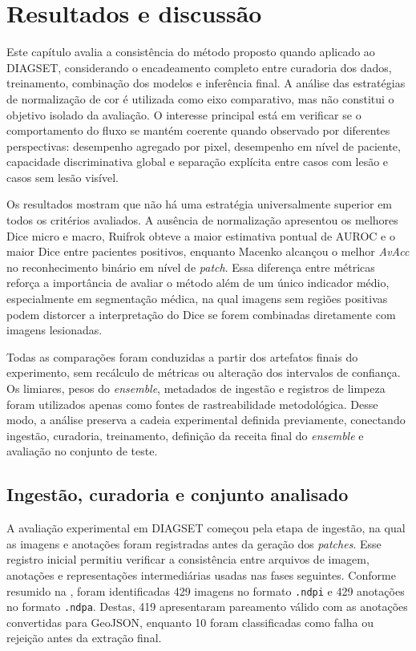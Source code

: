 \chapter{Resultados e discussão}\label{chp:resultados}

Este capítulo avalia a consistência do método proposto quando aplicado ao DIAGSET, considerando o encadeamento completo entre curadoria dos dados, treinamento, combinação dos modelos e inferência final. A análise das estratégias de normalização de cor é utilizada como eixo comparativo, mas não constitui o objetivo isolado da avaliação. O interesse principal está em verificar se o comportamento do fluxo se mantém coerente quando observado por diferentes perspectivas: desempenho agregado por pixel, desempenho em nível de paciente, capacidade discriminativa global e separação explícita entre casos com lesão e casos sem lesão visível.

Os resultados mostram que não há uma estratégia universalmente superior em todos os critérios avaliados. A ausência de normalização apresentou os melhores Dice micro e macro, Ruifrok obteve a maior estimativa pontual de AUROC e o maior Dice entre pacientes positivos, enquanto Macenko alcançou o melhor \textit{AvAcc} no reconhecimento binário em nível de \textit{patch}. Essa diferença entre métricas reforça a importância de avaliar o método além de um único indicador médio, especialmente em segmentação médica, na qual imagens sem regiões positivas podem distorcer a interpretação do Dice se forem combinadas diretamente com imagens lesionadas.

Todas as comparações foram conduzidas a partir dos artefatos finais do experimento, sem recálculo de métricas ou alteração dos intervalos de confiança. Os limiares, pesos do \textit{ensemble}, metadados de ingestão e registros de limpeza foram utilizados apenas como fontes de rastreabilidade metodológica. Desse modo, a análise preserva a cadeia experimental definida previamente, conectando ingestão, curadoria, treinamento, definição da receita final do \textit{ensemble} e avaliação no conjunto de teste.

\section{Ingestão, curadoria e conjunto analisado}
\label{sec:res_diagset_conjunto}

A avaliação experimental em DIAGSET começou pela etapa de ingestão, na qual as imagens e anotações foram registradas antes da geração dos \textit{patches}. Esse registro inicial permitiu verificar a consistência entre arquivos de imagem, anotações e representações intermediárias usadas nas fases seguintes. Conforme resumido na , foram identificadas 429 imagens no formato \texttt{.ndpi} e 429 anotações no formato \texttt{.ndpa}. Destas, 419 apresentaram pareamento válido com as anotações convertidas para GeoJSON, enquanto 10 foram classificadas como falha ou rejeição antes da extração final.

